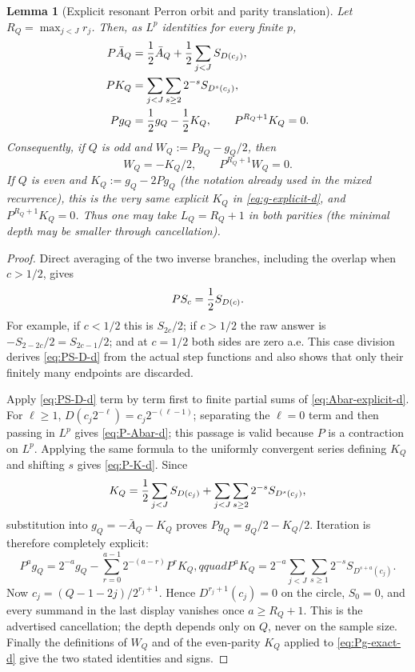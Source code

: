 \documentclass[11pt]{article}
\numberwithin{equation}{section}
\newtheorem{lemma}[theorem]{Lemma}
\newcommand{\1}{\mathbf 1}\newcommand{\F}{\mathcal F}\newcommand{\D}{\mathcal D}
\begin{document}
\begin{lemma}[Explicit resonant Perron orbit and parity translation]
\label{lem:explicit-perron-parity-d}
Let $R_Q=\max_{j<J}r_j$.  Then, as $L^p$ identities for every finite $p$,
\begin{align}
 P\bar A_Q&={1\over2}\bar A_Q+{1\over2}\sum_{j<J}S_{D(c_j)},
                                                        \label{eq:P-Abar-d}\\
 PK_Q&=\sum_{j<J}\sum_{s\ge2}2^{-s}S_{D^s(c_j)},       \label{eq:P-K-d}\\
 Pg_Q&={1\over2}g_Q-{1\over2}K_Q,\qquad
 P^{R_Q+1}K_Q=0.                                      \label{eq:Pg-exact-d}
\end{align}
Consequently, if $Q$ is odd and
$W_Q:=Pg_Q-g_Q/2$, then
\[
 W_Q=-K_Q/2,\qquad P^{R_Q+1}W_Q=0.
\]
If $Q$ is even and $K_Q:=g_Q-2Pg_Q$ (the notation already used in the mixed
recurrence), this is the very same explicit $K_Q$ in
\eqref{eq:g-explicit-d}, and $P^{R_Q+1}K_Q=0$.  Thus one may take
$L_Q=R_Q+1$ in both parities (the minimal depth may be smaller through
cancellation).
\end{lemma}
\begin{proof}
Direct averaging of the two inverse branches, including the overlap when
$c>1/2$, gives
\begin{equation}
 PS_c={1\over2}S_{D(c)}.                              \label{eq:PS-D-d}
\end{equation}
For example, if $c<1/2$ this is $S_{2c}/2$; if $c>1/2$ the raw answer is
$-S_{2-2c}/2=S_{2c-1}/2$; and at $c=1/2$ both sides are zero a.e.  This
case division derives \eqref{eq:PS-D-d} from the actual step functions and
also shows that only their finitely many endpoints are discarded.

Apply \eqref{eq:PS-D-d} term by term first to finite partial sums of
\eqref{eq:Abar-explicit-d}.  For $\ell\ge1$,
$D(c_j2^{-\ell})=c_j2^{-(\ell-1)}$; separating the $\ell=0$ term and then
passing in $L^p$ gives \eqref{eq:P-Abar-d}; this passage is valid because
$P$ is a contraction on $L^p$.  Applying the same formula to
the uniformly convergent series defining $K_Q$ and shifting $s$ gives
\eqref{eq:P-K-d}.  Since
\[
 K_Q={1\over2}\sum_{j<J}S_{D(c_j)}
       +\sum_{j<J}\sum_{s\ge2}2^{-s}S_{D^s(c_j)},
\]
substitution into $g_Q=-\bar A_Q-K_Q$ proves
$Pg_Q=g_Q/2-K_Q/2$.  Iteration is therefore completely explicit:
\begin{equation}
 P^ag_Q=2^{-a}g_Q-\sum_{r=0}^{a-1}2^{-(a-r)}P^rK_Q,qquad
 P^aK_Q=2^{-a}\sum_{j<J}\sum_{s\ge1}2^{-s}S_{D^{s+a}(c_j)}.
                                                        \label{eq:P-iterates-d}
\end{equation}
Now
$c_j=(Q-1-2j)/2^{r_j+1}$.  Hence $D^{r_j+1}(c_j)=0$ on the circle,
$S_0=0$, and every summand in the last display vanishes once
$a\ge R_Q+1$.  This is the advertised cancellation; the depth depends only
on $Q$, never on the sample size.  Finally the definitions of $W_Q$ and of
the even-parity $K_Q$ applied to \eqref{eq:Pg-exact-d} give the two stated
identities and signs.
\end{proof}
\end{document}
